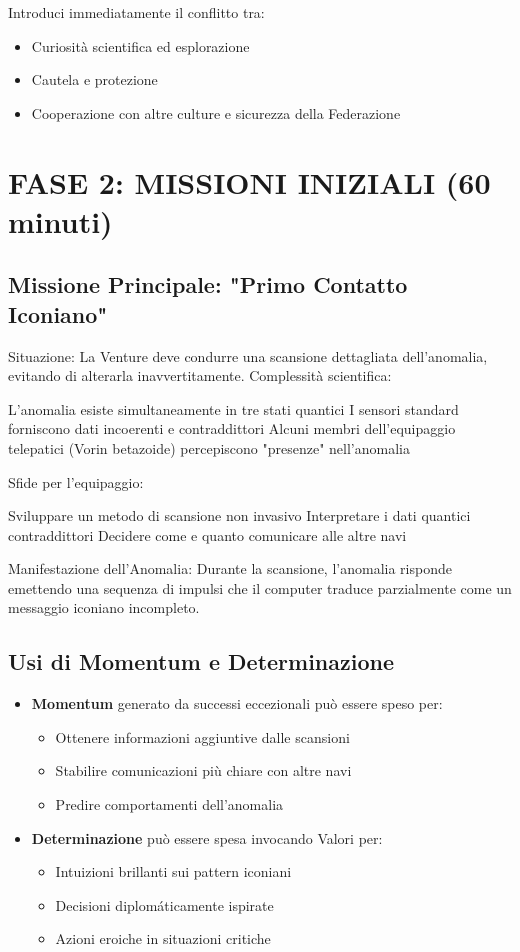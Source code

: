 \documentclass[letterpaper,twocolumn,openany,nodeprecatedcode]{dndbook}
\begin{document}
Introduci immediatamente il conflitto tra:

\begin{itemize}
    \item Curiosità scientifica ed esplorazione
    \item Cautela e protezione
    \item Cooperazione con altre culture e sicurezza della Federazione
\end{itemize}



\section{FASE 2: MISSIONI INIZIALI (60 minuti)}
\subsection{Missione Principale: "Primo Contatto Iconiano"}

Situazione: La Venture deve condurre una scansione dettagliata dell'anomalia, evitando di alterarla inavvertitamente.
Complessità scientifica:

L'anomalia esiste simultaneamente in tre stati quantici
I sensori standard forniscono dati incoerenti e contraddittori
Alcuni membri dell'equipaggio telepatici (Vorin betazoide) percepiscono "presenze" nell'anomalia


Sfide per l'equipaggio:

Sviluppare un metodo di scansione non invasivo
Interpretare i dati quantici contraddittori
Decidere come e quanto comunicare alle altre navi


Manifestazione dell'Anomalia: Durante la scansione, l'anomalia risponde emettendo una sequenza di impulsi che il computer traduce parzialmente come un messaggio iconiano incompleto.

\subsection{Usi di Momentum e Determinazione}

\begin{itemize}
    \item \textbf{Momentum} generato da successi eccezionali può essere speso per:
\begin{itemize}
    \item Ottenere informazioni aggiuntive dalle scansioni
    \item Stabilire comunicazioni più chiare con altre navi
    \item Predire comportamenti dell'anomalia
\end{itemize}
    \item \textbf{Determinazione} può essere spesa invocando Valori per:
\begin{itemize}
    \item Intuizioni brillanti sui pattern iconiani
    \item Decisioni diplomáticamente ispirate
    \item Azioni eroiche in situazioni critiche
\end{itemize}
\end{itemize}
\end{document}
